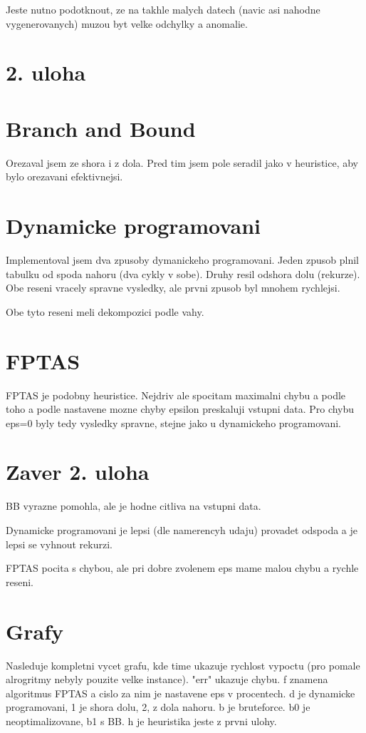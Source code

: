 \documentclass[12pt,a4paper]{article}
\begin{document}
Jeste nutno podotknout, ze na takhle malych datech (navic asi nahodne vygenerovanych) muzou byt velke odchylky a anomalie.


\section{2. uloha}

\section{Branch and Bound}
Orezaval jsem ze shora i z dola. Pred tim jsem pole seradil jako v heuristice, aby bylo orezavani efektivnejsi.

\section{Dynamicke programovani}
Implementoval jsem dva zpusoby dymanickeho programovani. Jeden zpusob plnil tabulku od spoda nahoru (dva cykly v sobe).
Druhy resil odshora dolu (rekurze). Obe reseni vracely spravne vysledky, ale prvni zpusob byl mnohem rychlejsi.

Obe tyto reseni meli dekompozici podle vahy.

\section{FPTAS}
FPTAS je podobny heuristice. Nejdriv ale spocitam maximalni chybu a podle toho a podle nastavene mozne chyby epsilon preskaluji vstupni data. Pro chybu eps=0 byly tedy vysledky spravne, stejne jako u dynamickeho programovani.


\section{Zaver 2. uloha}
BB vyrazne pomohla, ale je hodne citliva na vstupni data.

Dynamicke programovani je lepsi (dle namerencyh udaju) provadet odspoda a je lepsi se vyhnout rekurzi.

FPTAS pocita s chybou, ale pri dobre zvolenem eps mame malou chybu a rychle reseni.

\section{Grafy}

Nasleduje kompletni vycet grafu, kde time ukazuje  rychlost vypoctu (pro pomale alrogritmy nebyly pouzite velke instance). "err" ukazuje chybu. f znamena algoritmus FPTAS a cislo za nim je nastavene eps v procentech. d je dynamicke programovani, 1 je shora dolu, 2, z dola nahoru. b je bruteforce. b0 je neoptimalizovane, b1 s BB. h je heuristika jeste z prvni ulohy.
\end{document}
